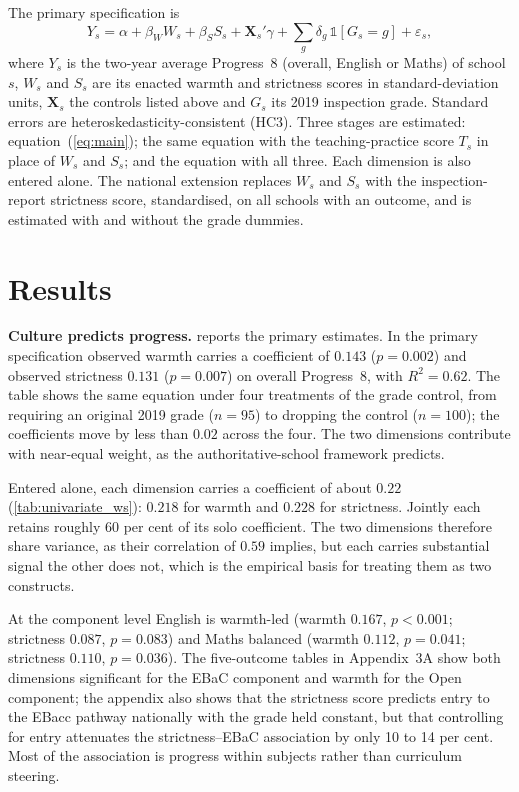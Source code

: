 The primary specification is
%
\begin{equation}
  \label{eq:main}
  Y_s = \alpha + \beta_W W_s + \beta_S S_s + \mathbf{X}_s'\gamma
        + \sum_g \delta_g \,\mathbb{1}[G_s = g] + \varepsilon_s ,
\end{equation}
%
where $Y_s$ is the two-year average Progress~8 (overall, English or Maths) of
school $s$, $W_s$ and $S_s$ are its enacted warmth and strictness scores in
standard-deviation units, $\mathbf{X}_s$ the controls listed above and $G_s$
its 2019 inspection grade. Standard errors are heteroskedasticity-consistent
(HC3). Three stages are estimated: equation~(\ref{eq:main}); the same
equation with the teaching-practice score $T_s$ in place of $W_s$ and $S_s$;
and the equation with all three. Each dimension is also entered alone. The
national extension replaces $W_s$ and $S_s$ with the inspection-report
strictness score, standardised, on all schools with an outcome, and is
estimated with and without the grade dummies.

\section{Results}
\label{sec:p2_results}

\textbf{Culture predicts progress.}  reports the
primary estimates. In the primary specification observed warmth carries a
coefficient of $0.143$ ($p = 0.002$) and observed strictness $0.131$
($p = 0.007$) on overall Progress~8, with $R^2 = 0.62$. The table shows the
same equation under four treatments of the grade control, from requiring an
original 2019 grade ($n = 95$) to dropping the control ($n = 100$); the
coefficients move by less than $0.02$ across the four. The two dimensions
contribute with near-equal weight, as the authoritative-school framework
predicts.



Entered alone, each dimension carries a coefficient of about $0.22$
(\cref{tab:univariate_ws}): $0.218$ for warmth and $0.228$ for strictness.
Jointly each retains roughly 60 per cent of its solo coefficient. The two
dimensions therefore share variance, as their correlation of $0.59$ implies,
but each carries substantial signal the other does not, which is the
empirical basis for treating them as two constructs.



At the component level English is warmth-led (warmth $0.167$, $p < 0.001$;
strictness $0.087$, $p = 0.083$) and Maths balanced (warmth $0.112$,
$p = 0.041$; strictness $0.110$, $p = 0.036$). The five-outcome tables in
Appendix~3A show both dimensions significant for the EBaC component and
warmth for the Open component; the appendix also shows that the strictness
score predicts entry to the EBacc pathway nationally with the grade held
constant, but that controlling for entry attenuates the strictness--EBaC
association by only 10 to 14 per cent. Most of the association is progress
within subjects rather than curriculum steering.

